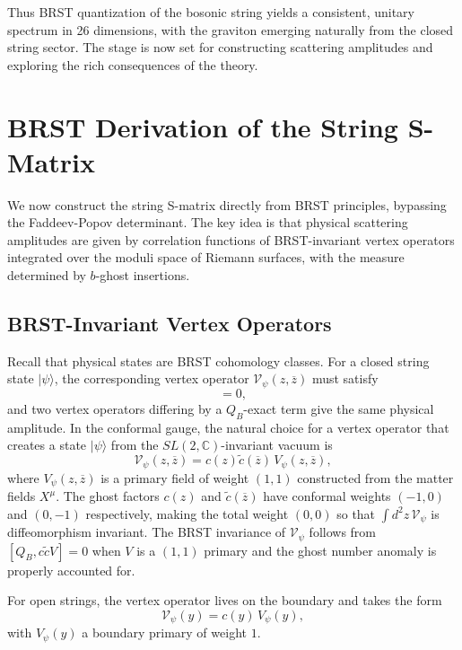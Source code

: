 \documentclass[11pt]{article}
\renewcommand{\tilde}{\widetilde}
\renewcommand{\bar}{\overline}
\begin{document}
Thus BRST quantization of the bosonic string yields a consistent, unitary spectrum in 26 dimensions, with the graviton emerging naturally from the closed string sector. The stage is now set for constructing scattering amplitudes and exploring the rich consequences of the theory.

\section{BRST Derivation of the String S-Matrix}

We now construct the string S-matrix directly from BRST principles, bypassing the Faddeev-Popov determinant. The key idea is that physical scattering amplitudes are given by correlation functions of BRST-invariant vertex operators integrated over the moduli space of Riemann surfaces, with the measure determined by $b$-ghost insertions.

\subsection{BRST-Invariant Vertex Operators}

Recall that physical states are BRST cohomology classes. For a closed string state $|\psi\rangle$, the corresponding vertex operator $\mathcal{V}_\psi(z,\bar{z})$ must satisfy
\begin{equation}
[Q_B, \mathcal{V}_\psi] = 0,
\end{equation}
and two vertex operators differing by a $Q_B$-exact term give the same physical amplitude. In the conformal gauge, the natural choice for a vertex operator that creates a state $|\psi\rangle$ from the $SL(2,\mathbb{C})$-invariant vacuum is
\begin{equation}
\mathcal{V}_\psi(z,\bar{z}) = c(z) \tilde{c}(\bar{z}) \, V_\psi(z,\bar{z}),
\end{equation}
where $V_\psi(z,\bar{z})$ is a primary field of weight $(1,1)$ constructed from the matter fields $X^\mu$. The ghost factors $c(z)$ and $\tilde{c}(\bar{z})$ have conformal weights $(-1,0)$ and $(0,-1)$ respectively, making the total weight $(0,0)$ so that $\int d^2z \, \mathcal{V}_\psi$ is diffeomorphism invariant. The BRST invariance of $\mathcal{V}_\psi$ follows from $[Q_B, c\tilde{c}V] = 0$ when $V$ is a $(1,1)$ primary and the ghost number anomaly is properly accounted for.

For open strings, the vertex operator lives on the boundary and takes the form
\begin{equation}
\mathcal{V}_\psi(y) = c(y) \, V_\psi(y),
\end{equation}
with $V_\psi(y)$ a boundary primary of weight $1$.
\end{document}
